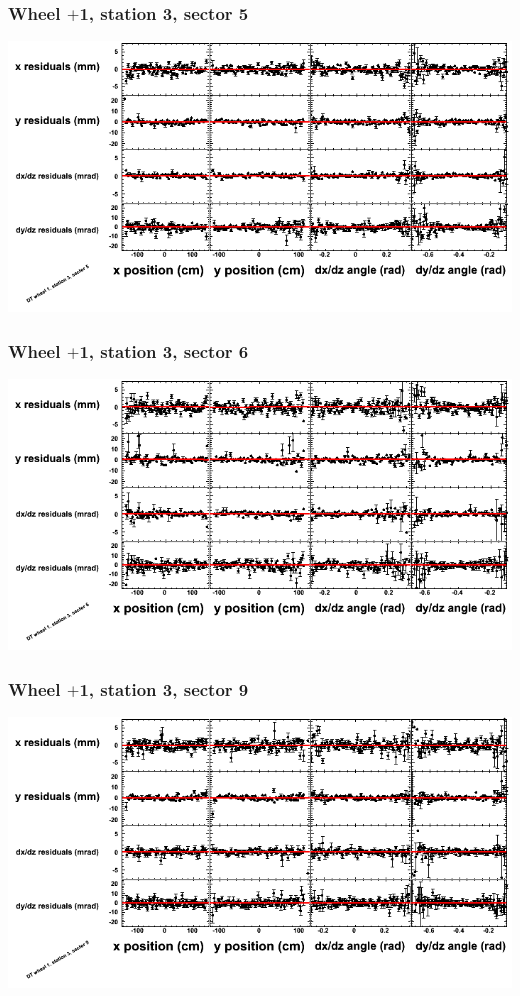\documentclass[compress]{beamer}
\begin{document}
\begin{frame}
\frametitle{Wheel $+$1, station 3, sector 5}
\includegraphics[width=\linewidth]{tmppoly_MBwhDst3sec05.png}
\end{frame}

\begin{frame}
\frametitle{Wheel $+$1, station 3, sector 6}
\includegraphics[width=\linewidth]{tmppoly_MBwhDst3sec06.png}
\end{frame}

\begin{frame}
\frametitle{Wheel $+$1, station 3, sector 9}
\includegraphics[width=\linewidth]{tmppoly_MBwhDst3sec09.png}
\end{frame}
\end{document}

